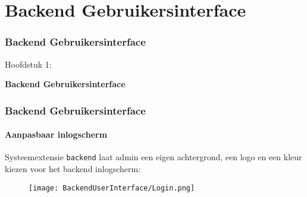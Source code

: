 %

\section{Backend Gebruikersinterface}
\begin{frame}[fragile]
	\frametitle{Backend Gebruikersinterface}

	\begin{center}\huge{Hoofdstuk 1:}\end{center}
	\begin{center}\huge{\color{typo3darkgrey}\textbf{Backend Gebruikersinterface}}\end{center}

\end{frame}

\begin{frame}[fragile]
	\frametitle{Backend Gebruikersinterface}
	\framesubtitle{Aanpasbaar inlogscherm}

	Systeemextensie \texttt{backend} laat admin een eigen achtergrond, een logo
	en een kleur kiezen voor het backend inlogscherm:

	\begin{figure}
		\texttt{[image: BackendUserInterface/Login.png]}
	\end{figure}

\end{frame}

